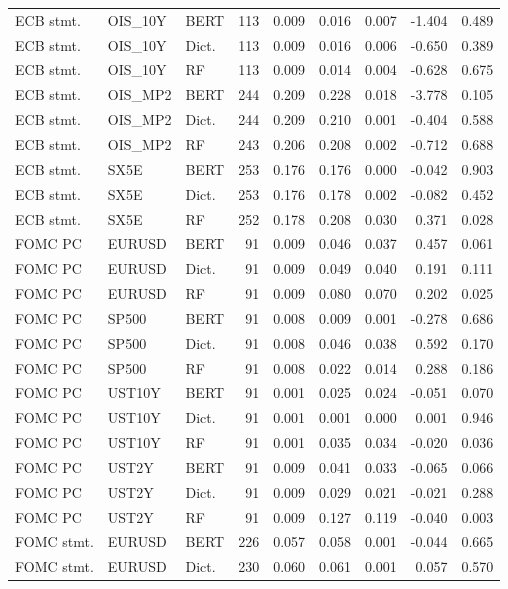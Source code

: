 \begin{longtable}{@{}p{2.15cm}p{1.25cm}p{0.95cm}rrrrrr@{}}
ECB stmt. & OIS\_10Y & BERT & 113 & 0.009 & 0.016 & 0.007 & -1.404 & 0.489 \\
ECB stmt. & OIS\_10Y & Dict. & 113 & 0.009 & 0.016 & 0.006 & -0.650 & 0.389 \\
ECB stmt. & OIS\_10Y & RF & 113 & 0.009 & 0.014 & 0.004 & -0.628 & 0.675 \\
ECB stmt. & OIS\_MP2 & BERT & 244 & 0.209 & 0.228 & 0.018 & -3.778 & 0.105 \\
ECB stmt. & OIS\_MP2 & Dict. & 244 & 0.209 & 0.210 & 0.001 & -0.404 & 0.588 \\
ECB stmt. & OIS\_MP2 & RF & 243 & 0.206 & 0.208 & 0.002 & -0.712 & 0.688 \\
ECB stmt. & SX5E & BERT & 253 & 0.176 & 0.176 & 0.000 & -0.042 & 0.903 \\
ECB stmt. & SX5E & Dict. & 253 & 0.176 & 0.178 & 0.002 & -0.082 & 0.452 \\
ECB stmt. & SX5E & RF & 252 & 0.178 & 0.208 & 0.030 & 0.371 & 0.028 \\
FOMC PC & EURUSD & BERT & 91 & 0.009 & 0.046 & 0.037 & 0.457 & 0.061 \\
FOMC PC & EURUSD & Dict. & 91 & 0.009 & 0.049 & 0.040 & 0.191 & 0.111 \\
FOMC PC & EURUSD & RF & 91 & 0.009 & 0.080 & 0.070 & 0.202 & 0.025 \\
FOMC PC & SP500 & BERT & 91 & 0.008 & 0.009 & 0.001 & -0.278 & 0.686 \\
FOMC PC & SP500 & Dict. & 91 & 0.008 & 0.046 & 0.038 & 0.592 & 0.170 \\
FOMC PC & SP500 & RF & 91 & 0.008 & 0.022 & 0.014 & 0.288 & 0.186 \\
FOMC PC & UST10Y & BERT & 91 & 0.001 & 0.025 & 0.024 & -0.051 & 0.070 \\
FOMC PC & UST10Y & Dict. & 91 & 0.001 & 0.001 & 0.000 & 0.001 & 0.946 \\
FOMC PC & UST10Y & RF & 91 & 0.001 & 0.035 & 0.034 & -0.020 & 0.036 \\
FOMC PC & UST2Y & BERT & 91 & 0.009 & 0.041 & 0.033 & -0.065 & 0.066 \\
FOMC PC & UST2Y & Dict. & 91 & 0.009 & 0.029 & 0.021 & -0.021 & 0.288 \\
FOMC PC & UST2Y & RF & 91 & 0.009 & 0.127 & 0.119 & -0.040 & 0.003 \\
FOMC stmt. & EURUSD & BERT & 226 & 0.057 & 0.058 & 0.001 & -0.044 & 0.665 \\
FOMC stmt. & EURUSD & Dict. & 230 & 0.060 & 0.061 & 0.001 & 0.057 & 0.570 \\

\end{longtable}
